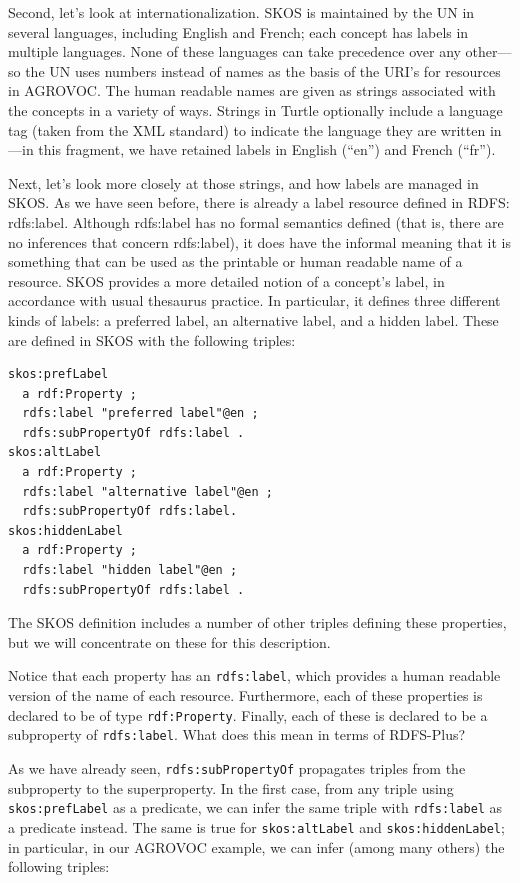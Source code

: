 Second, let's look at internationalization. SKOS is maintained by the UN
in several languages, including English and French; each concept has
labels in multiple languages. None of these languages can take
precedence over any other---so the UN uses numbers instead of names as
the basis of the URI's for resources in AGROVOC. The human readable
names are given as strings associated with the concepts in a variety of
ways. Strings in Turtle optionally include a language tag (taken from
the XML standard) to indicate the language they are written in---in this
fragment, we have retained labels in English (``en'') and French
(``fr'').

Next, let's look more closely at those strings, and how labels are
managed in SKOS. As we have seen before, there is already a label
resource defined in RDFS: rdfs:label. Although rdfs:label has no formal
semantics defined (that is, there are no inferences that concern
rdfs:label), it does have the informal meaning that it is something that
can be used as the printable or human readable name of a resource. SKOS
provides a more detailed notion of a concept's label, in accordance with
usual thesaurus practice. In particular, it defines three different
kinds of labels: a preferred label, an alternative label, and a hidden
label. These are defined in SKOS with the following triples:

\begin{lstlisting}
skos:prefLabel
  a rdf:Property ;
  rdfs:label "preferred label"@en ;
  rdfs:subPropertyOf rdfs:label .
skos:altLabel
  a rdf:Property ;
  rdfs:label "alternative label"@en ;
  rdfs:subPropertyOf rdfs:label.
skos:hiddenLabel
  a rdf:Property ;
  rdfs:label "hidden label"@en ;
  rdfs:subPropertyOf rdfs:label .
\end{lstlisting}

The SKOS definition includes a number of other triples defining these
properties, but we will concentrate on these for this description.

Notice that each property has an \texttt{rdfs:label}, which provides a human
readable version of the name of each resource. Furthermore, each of
these properties is declared to be of type \texttt{rdf:Property}. Finally, each
of these is declared to be a subproperty of \texttt{rdfs:label}. What does this
mean in terms of RDFS-Plus?

As we have already seen, \texttt{rdfs:subPropertyOf} propagates triples from the
subproperty to the superproperty. In the first case, from any triple
using \texttt{skos:prefLabel} as a predicate, we can infer the same triple with
\texttt{rdfs:label} as a predicate instead. The same is true for \texttt{skos:altLabel}
and \texttt{skos:hiddenLabel}; in particular, in our AGROVOC example, we can
infer (among many others) the following triples:

